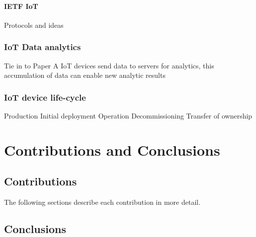 \subsubsection{IETF IoT}
Protocols and ideas

\subsection{IoT Data analytics}
Tie in to Paper A
IoT devices send data to servers for analytics, this accumulation of data can enable new analytic results 

\subsection{IoT device life-cycle}
Production
Initial deployment
Operation
Decommissioning
Transfer of ownership

\chapter{Contributions and Conclusions}
\section{Contributions}
The following sections describe each contribution in more detail.

\subsection{\paperItitle}

\section{Conclusions}
\label{sec:kappa-conclusions}
{ \raggedright
\printbibliography[segment=\therefsegment,heading=bibintoc]
}
